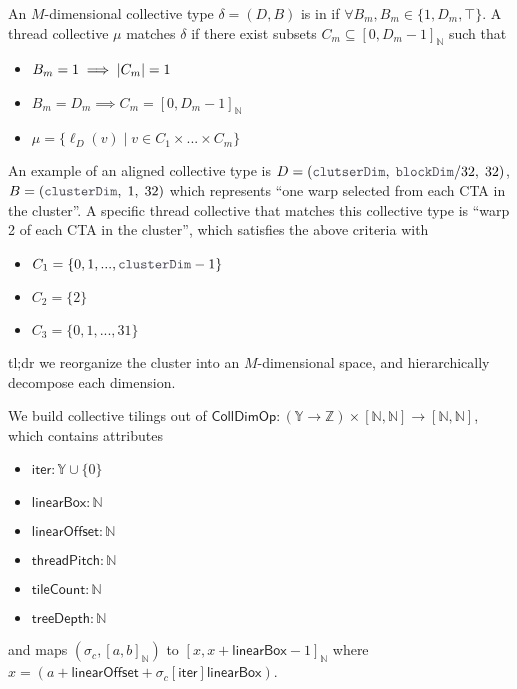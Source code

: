 \filbreak
{}

An $M$-dimensional collective type $\delta = (D, B)$ is in  if $\forall B_m, B_m \in \{1, D_m, \top\}$.
A thread collective $\mu$ matches $\delta$ if there exist subsets $C_m \subseteq [0, D_m - 1]_\mathbb{N}$ such that
\begin{itemize}
  \item $B_m = 1 \implies \left \vert C_m \right\vert = 1$
  \item $B_m = D_m \implies C_m = [0, D_m-1]_\mathbb{N}$
  \item $\mu = \{ \ell_D(v) \mid v \in C_1 \times ... \times C_m \}$
\end{itemize}

An example of an aligned collective type is $D = (\lighttt{clutserDim},\;\lighttt{blockDim} / 32,\;32)$, $B = (\lighttt{clusterDim},\;1,\;32)$ which represents ``one warp selected from each CTA in the cluster''.
A specific thread collective that matches this collective type is ``warp 2 of each CTA in the cluster'', which satisfies the above criteria with
\begin{itemize}
  \item $C_1 = \{ 0, 1, ..., \lighttt{clusterDim}-1 \}$
  \item $C_2 = \{ 2 \}$
  \item $C_3 = \{ 0, 1, ..., 31 \}$
\end{itemize}

\filbreak
{}

tl;dr we reorganize the cluster into an $M$-dimensional space, and hierarchically decompose each dimension.

We build collective tilings out of $\mathsf{CollDimOp}: (\mathbb{Y} \to \mathbb{Z}) \times [\mathbb{N}, \mathbb{N}] \to [\mathbb{N}, \mathbb{N}]$, which contains attributes
\begin{itemize}
  \item $\mathsf{iter}: \mathbb{Y} \cup \{0\}$
  \filbreak
  \item $\mathsf{linearBox}: \mathbb{N}$
  \filbreak
  \item $\mathsf{linearOffset}: \mathbb{N}$
  \filbreak
  \item $\mathsf{threadPitch}: \mathbb{N}$
  \filbreak
  \item $\mathsf{tileCount}: \mathbb{N}$
  \filbreak
  \item $\mathsf{treeDepth}: \mathbb{N}$
\end{itemize}
and maps $(\sigma_c, [a, b]_\mathbb{N})$ to $[x, x + \mathsf{linearBox} - 1]_\mathbb{N}$ where $x = (a + \mathsf{linearOffset} + \sigma_c[\mathsf{iter}] \mathsf{linearBox})$.

